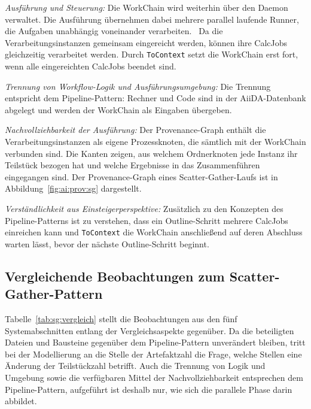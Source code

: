 \emph{Ausführung und Steuerung:} Die WorkChain wird weiterhin über
den Daemon verwaltet. Die Ausführung übernehmen dabei mehrere parallel laufende Runner, die Aufgaben unabhängig voneinander verarbeiten.~\cite[S.~3]{huber2020aiida} Da die
Verarbeitungsinstanzen gemeinsam eingereicht werden, können ihre
CalcJobs gleichzeitig verarbeitet werden. Durch \texttt{ToContext}
setzt die WorkChain erst fort, wenn alle eingereichten CalcJobs
beendet sind.


\emph{Trennung von Workflow-Logik und Ausführungsumgebung:} Die
Trennung entspricht dem Pipeline-Pattern: Rechner und Code sind in
der AiiDA-Datenbank abgelegt und werden der WorkChain als Eingaben
übergeben.


\emph{Nachvollziehbarkeit der Ausführung:} Der Provenance-Graph
enthält die Verarbeitungsinstanzen als eigene Prozessknoten, die
sämtlich mit der WorkChain verbunden sind. Die Kanten zeigen, aus
welchem Ordnerknoten jede Instanz ihr Teilstück bezogen hat und
welche Ergebnisse in das Zusammenführen eingegangen sind. Der
Provenance-Graph eines Scatter-Gather-Laufs ist in
Abbildung~\ref{fig:ai:prov:sg} dargestellt.

\emph{Verständlichkeit aus Einsteigerperspektive:} Zusätzlich zu den
Konzepten des Pipeline-Patterns ist zu verstehen, dass ein
Outline-Schritt mehrere CalcJobs einreichen kann und
\texttt{ToContext} die WorkChain anschließend auf deren Abschluss
warten lässt, bevor der nächste Outline-Schritt beginnt.

\subsection{Vergleichende Beobachtungen zum Scatter-Gather-Pattern}
\label{sec:lokal:sg:zusammenfassung}

Tabelle~\ref{tab:sg:vergleich} stellt die Beobachtungen aus den fünf
Systemabschnitten entlang der Vergleichsaspekte gegenüber. Da die
beteiligten Dateien und Bausteine gegenüber dem Pipeline-Pattern
unverändert bleiben, tritt bei der Modellierung an die Stelle der
Artefaktzahl die Frage, welche Stellen eine Änderung der
Teilstückzahl betrifft. Auch die Trennung von Logik und Umgebung
sowie die verfügbaren Mittel der Nachvollziehbarkeit entsprechen dem
Pipeline-Pattern, aufgeführt ist deshalb nur, wie sich die parallele
Phase darin abbildet.

